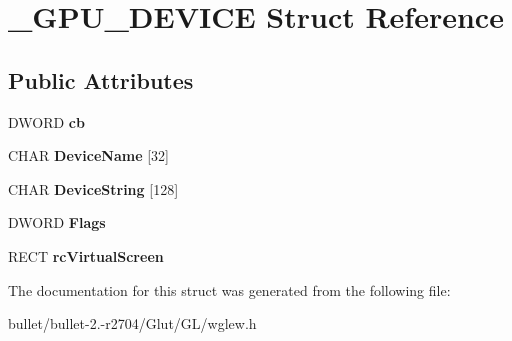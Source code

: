 \hypertarget{struct___g_p_u___d_e_v_i_c_e}{\section{\+\_\+\+G\+P\+U\+\_\+\+D\+E\+V\+I\+C\+E Struct Reference}
\label{struct___g_p_u___d_e_v_i_c_e}
}
\subsection*{Public Attributes}
\begin{DoxyCompactItemize}
\item 
\hypertarget{struct___g_p_u___d_e_v_i_c_e_afcb22f16ba9e526610489ff56ab78ddb}{D\+W\+O\+R\+D {\bfseries cb}}\label{struct___g_p_u___d_e_v_i_c_e_afcb22f16ba9e526610489ff56ab78ddb}

\item 
\hypertarget{struct___g_p_u___d_e_v_i_c_e_a604bfab61f1a2c5d1e635837d369ba14}{C\+H\+A\+R {\bfseries Device\+Name} \mbox{[}32\mbox{]}}\label{struct___g_p_u___d_e_v_i_c_e_a604bfab61f1a2c5d1e635837d369ba14}

\item 
\hypertarget{struct___g_p_u___d_e_v_i_c_e_aff8b7920ccc85afcd6f325da6cdb0b73}{C\+H\+A\+R {\bfseries Device\+String} \mbox{[}128\mbox{]}}\label{struct___g_p_u___d_e_v_i_c_e_aff8b7920ccc85afcd6f325da6cdb0b73}

\item 
\hypertarget{struct___g_p_u___d_e_v_i_c_e_a008db9d0f5fc13a5160805f40465f14a}{D\+W\+O\+R\+D {\bfseries Flags}}\label{struct___g_p_u___d_e_v_i_c_e_a008db9d0f5fc13a5160805f40465f14a}

\item 
\hypertarget{struct___g_p_u___d_e_v_i_c_e_aeb573bbeb3b6c589246720ef259b9a27}{R\+E\+C\+T {\bfseries rc\+Virtual\+Screen}}\label{struct___g_p_u___d_e_v_i_c_e_aeb573bbeb3b6c589246720ef259b9a27}

\end{DoxyCompactItemize}


The documentation for this struct was generated from the following file\+:\begin{DoxyCompactItemize}
\item 
bullet/bullet-\/2.-\/r2704/\+Glut/\+G\+L/wglew.\+h\end{DoxyCompactItemize}
